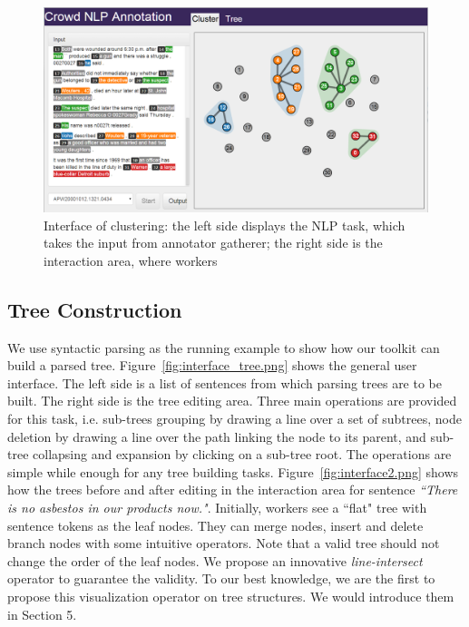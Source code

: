 \begin{figure}
\centering
\includegraphics[width=6.1in]{figs/interface1_v2.png}
\caption{Interface of clustering: the left side displays the NLP task, which takes the input from annotator gatherer; the right side is the interaction area, where workers}
\label{fig:interface1.png}
\end{figure}

\subsection{Tree Construction}

We use syntactic parsing as the running example to show how our
toolkit can build a parsed tree. Figure~\ref{fig:interface_tree.png}
shows the general user interface. The left side is a list of sentences
from which parsing trees are to be built. The right side is the
tree editing area. Three main operations are provided for this task,
i.e. sub-trees grouping by drawing a line over a set of subtrees, node
deletion by drawing a line over the path linking the node to its
parent, and sub-tree collapsing and expansion by clicking on a
sub-tree root. The operations are simple while enough for any tree
building tasks. Figure~\ref{fig:interface2.png} shows how the
trees before and after editing in the interaction area for sentence
{\em ``There is no asbestos in our products now."}. Initially, workers
see a ``flat" tree with sentence tokens as the leaf nodes. They can
merge nodes, insert and delete branch nodes with some intuitive
operators. Note that a valid tree should not change the order of the
leaf nodes. We propose an innovative {\em line-intersect} operator to
guarantee the validity. To our best knowledge, we are the first to
propose this visualization operator on tree structures. We would
introduce them in Section 5.

